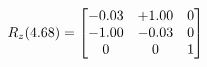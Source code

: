 \documentclass[preview]{standalone}
\begin{document}
\begin{align*}
\special{dvisvgm:raw <g id='unique000'>}R_{z}(4.68) = \begin{bmatrix}-0.03 & +1.00 & 0 \\-1.00 & -0.03 & 0 \\0 & 0 & 1\end{bmatrix}\special{dvisvgm:raw </g>}
\end{align*}
\end{document}
